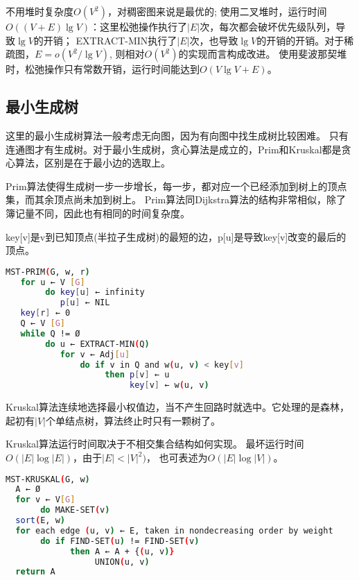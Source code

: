 不用堆时复杂度$O(V^2)$，对稠密图来说是最优的;
使用二叉堆时，运行时间$O((V+E)\lg V)$：这里松弛操作执行了$|E|$次，每次都会破坏优先级队列，导致$\lg V$的开销；
EXTRACT-MIN执行了$|E|$次，也导致$\lg V$的开销的开销。对于稀疏图，$E=o(V^2/ \lg V)$, 则相对$O(V^2)$的实现而言构成改进。
使用斐波那契堆时，松弛操作只有常数开销，运行时间能达到$O(V\lg V + E)$。

\subsection{最小生成树}
这里的最小生成树算法一般考虑无向图，因为有向图中找生成树比较困难。
只有连通图才有生成树。对于最小生成树，贪心算法是成立的，Prim和Kruskal都是贪心算法，区别是在于最小边的选取上。

Prim算法使得生成树一步一步增长，每一步，都对应一个已经添加到树上的顶点集，而其余顶点尚未加到树上。
Prim算法同Dijkstra算法的结构非常相似，除了簿记量不同，因此也有相同的时间复杂度。

key[v]是v到已知顶点(半拉子生成树)的最短的边，p[u]是导致key[v]改变的最后的顶点。
\begin{lstlisting}[language=bash]
MST-PRIM(G, w, r)
   for u ← V [G]
        do key[u] ← infinity
           p[u] ← NIL
   key[r] ← 0
   Q ← V [G]
   while Q != Ø 
        do u ← EXTRACT-MIN(Q)
           for v ← Adj[u] 
               do if v in Q and w(u, v) < key[v]
                    then p[v] ← u
                         key[v] ← w(u, v)
\end{lstlisting}

Kruskal算法连续地选择最小权值边，当不产生回路时就选中。它处理的是森林，起初有$|V|$个单结点树，算法终止时只有一颗树了。


Kruskal算法运行时间取决于不相交集合结构如何实现。
最坏运行时间$O(|E|\log|E|)$，由于$|E| < |V|^2)$，
也可表述为$O(|E|\log|V|)$。

\begin{lstlisting}[language=bash]
MST-KRUSKAL(G, w)
  A ← Ø
  for v ← V[G]
       do MAKE-SET(v)
  sort(E, w)
  for each edge (u, v) ← E, taken in nondecreasing order by weight
       do if FIND-SET(u) != FIND-SET(v)
             then A ← A + {(u, v)}
                  UNION(u, v)
  return A
\end{lstlisting}





















